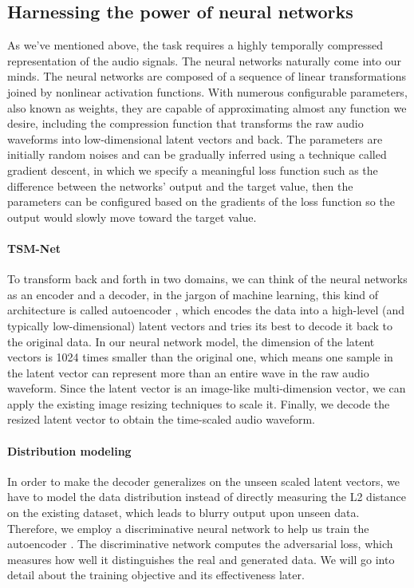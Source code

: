 \documentclass[12pt]{article}
\begin{document}
\subsection{Harnessing the power of neural networks}
As we've mentioned above, the task requires a highly temporally compressed representation of the audio signals. The neural networks naturally come into our minds. The neural networks are composed of a sequence of linear transformations joined by nonlinear activation functions. With numerous configurable parameters, also known as weights, they are capable of approximating almost any function we desire, including the compression function that transforms the raw audio waveforms into low-dimensional latent vectors and back. The parameters are initially random noises and can be gradually inferred using a technique called gradient descent, in which we specify a meaningful loss function such as the difference between the networks' output and the target value, then the parameters can be configured based on the gradients of the loss function so the output would slowly move toward the target value.

\paragraph{TSM-Net}
To transform back and forth in two domains, we can think of the neural networks as an encoder and a decoder, in the jargon of machine learning, this kind of architecture is called autoencoder \cite{kra91}, which encodes the data into a high-level (and typically low-dimensional) latent vectors and tries its best to decode it back to the original data. In our neural network model, the dimension of the latent vectors is 1024 times smaller than the original one, which means one sample in the latent vector can represent more than an entire wave in the raw audio waveform. Since the latent vector is an image-like multi-dimension vector, we can apply the existing image resizing techniques to scale it. Finally, we decode the resized latent vector to obtain the time-scaled audio waveform.

\paragraph{Distribution modeling}
In order to make the decoder generalizes on the unseen scaled latent vectors, we have to model the data distribution instead of directly measuring the L2 distance on the existing dataset, which leads to blurry output upon unseen data. Therefore, we employ a discriminative neural network to help us train the autoencoder \cite{goo14}. The discriminative network computes the adversarial loss, which measures how well it distinguishes the real and generated data. We will go into detail about the training objective and its effectiveness later.
\end{document}
